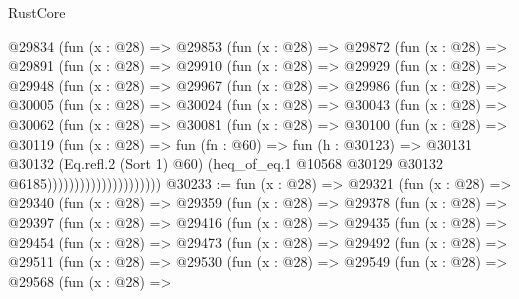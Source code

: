 \begin{lexlean}{RustCore}
\begin{coremodule}
          @29834
            (fun (x : @28) =>
            @29853
              (fun (x : @28) =>
              @29872
                (fun (x : @28) =>
                @29891
                  (fun (x : @28) =>
                  @29910
                    (fun (x : @28) =>
                    @29929
                      (fun (x : @28) =>
                      @29948
                        (fun (x : @28) =>
                        @29967
                          (fun (x : @28) =>
                          @29986
                            (fun (x : @28) =>
                            @30005
                              (fun (x : @28) =>
                              @30024
                                (fun (x : @28) =>
                                @30043
                                  (fun (x : @28) =>
                                  @30062
                                    (fun (x : @28) =>
                                    @30081
                                      (fun (x : @28) =>
                                      @30100
                                        (fun (x : @28) =>
                                        @30119
                                          (fun (x : @28) =>
                                          fun (fn : @60) =>
                                          fun (h : @30123) =>
                                          @30131
                                            @30132
                                            (Eq.refl.{2} (Sort 1) @60)
                                            (heq_of_eq.{1}
                                              @10568
                                              @30129
                                              @30132
                                              @6185)))))))))))))))))))))
@30233 := fun (x : @28) =>
  @29321
    (fun (x : @28) =>
    @29340
      (fun (x : @28) =>
      @29359
        (fun (x : @28) =>
        @29378
          (fun (x : @28) =>
          @29397
            (fun (x : @28) =>
            @29416
              (fun (x : @28) =>
              @29435
                (fun (x : @28) =>
                @29454
                  (fun (x : @28) =>
                  @29473
                    (fun (x : @28) =>
                    @29492
                      (fun (x : @28) =>
                      @29511
                        (fun (x : @28) =>
                        @29530
                          (fun (x : @28) =>
                          @29549
                            (fun (x : @28) =>
                            @29568
                              (fun (x : @28) =>

\end{coremodule}
\end{lexlean}
